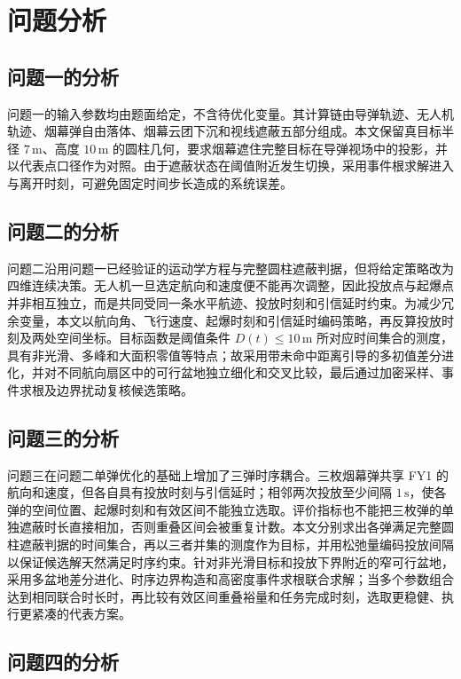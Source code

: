 \section{问题分析}

\subsection{问题一的分析}

问题一的输入参数均由题面给定，不含待优化变量。其计算链由导弹轨迹、无人机轨迹、烟幕弹自由落体、烟幕云团下沉和视线遮蔽五部分组成。本文保留真目标半径 $7\,\mathrm{m}$、高度 $10\,\mathrm{m}$ 的圆柱几何，要求烟幕遮住完整目标在导弹视场中的投影，并以代表点口径作为对照。由于遮蔽状态在阈值附近发生切换，采用事件根求解进入与离开时刻，可避免固定时间步长造成的系统误差。
\subsection{问题二的分析}

问题二沿用问题一已经验证的运动学方程与完整圆柱遮蔽判据，但将给定策略改为四维连续决策。无人机一旦选定航向和速度便不能再次调整，因此投放点与起爆点并非相互独立，而是共同受同一条水平航迹、投放时刻和引信延时约束。为减少冗余变量，本文以航向角、飞行速度、起爆时刻和引信延时编码策略，再反算投放时刻及两处空间坐标。目标函数是阈值条件 $D(t)\le 10\,\mathrm{m}$ 所对应时间集合的测度，具有非光滑、多峰和大面积零值等特点；故采用带未命中距离引导的多初值差分进化，并对不同航向扇区中的可行盆地独立细化和交叉比较，最后通过加密采样、事件求根及边界扰动复核候选策略。

\subsection{问题三的分析}

问题三在问题二单弹优化的基础上增加了三弹时序耦合。三枚烟幕弹共享 FY1 的航向和速度，但各自具有投放时刻与引信延时；相邻两次投放至少间隔 $1\,\mathrm{s}$，使各弹的空间位置、起爆时刻和有效区间不能独立选取。评价指标也不能把三枚弹的单独遮蔽时长直接相加，否则重叠区间会被重复计数。本文分别求出各弹满足完整圆柱遮蔽判据的时间集合，再以三者并集的测度作为目标，并用松弛量编码投放间隔以保证候选解天然满足时序约束。针对非光滑目标和投放下界附近的窄可行盆地，采用多盆地差分进化、时序边界构造和高密度事件求根联合求解；当多个参数组合达到相同联合时长时，再比较有效区间重叠裕量和任务完成时刻，选取更稳健、执行更紧凑的代表方案。

\subsection{问题四的分析}

